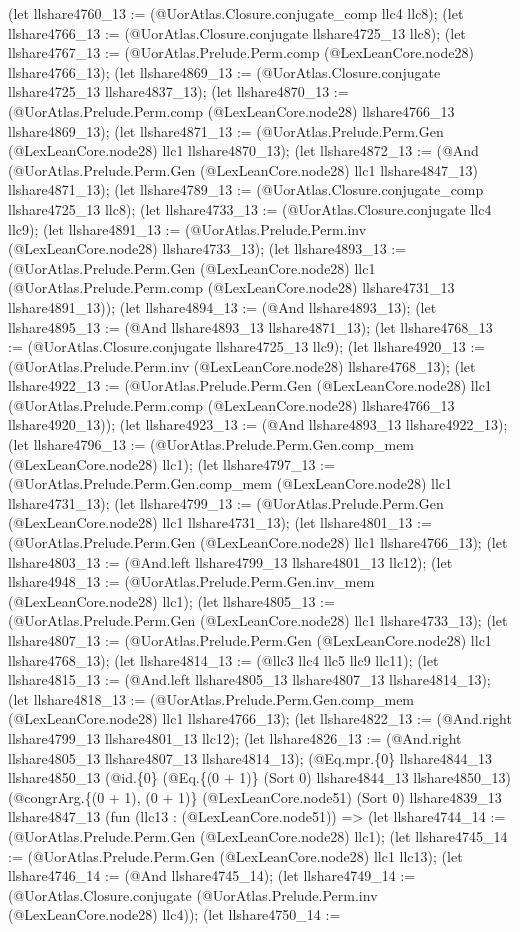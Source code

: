 \documentclass[11pt]{article}
\begin{document}
(let llshare4760\_13 := (@UorAtlas.Closure.conjugate\_comp llc4 llc8); (let llshare4766\_13 := (@UorAtlas.Closure.conjugate llshare4725\_13 llc8); (let llshare4767\_13 := (@UorAtlas.Prelude.Perm.comp (@LexLeanCore.node28) llshare4766\_13); (let llshare4869\_13 := (@UorAtlas.Closure.conjugate llshare4725\_13 llshare4837\_13); (let llshare4870\_13 := (@UorAtlas.Prelude.Perm.comp (@LexLeanCore.node28) llshare4766\_13 llshare4869\_13); (let llshare4871\_13 := (@UorAtlas.Prelude.Perm.Gen (@LexLeanCore.node28) llc1 llshare4870\_13); (let llshare4872\_13 := (@And (@UorAtlas.Prelude.Perm.Gen (@LexLeanCore.node28) llc1 llshare4847\_13) llshare4871\_13); (let llshare4789\_13 := (@UorAtlas.Closure.conjugate\_comp llshare4725\_13 llc8); (let llshare4733\_13 := (@UorAtlas.Closure.conjugate llc4 llc9); (let llshare4891\_13 := (@UorAtlas.Prelude.Perm.inv (@LexLeanCore.node28) llshare4733\_13); (let llshare4893\_13 := (@UorAtlas.Prelude.Perm.Gen (@LexLeanCore.node28) llc1 (@UorAtlas.Prelude.Perm.comp (@LexLeanCore.node28) llshare4731\_13 llshare4891\_13)); (let llshare4894\_13 := (@And llshare4893\_13); (let llshare4895\_13 := (@And llshare4893\_13 llshare4871\_13); (let llshare4768\_13 := (@UorAtlas.Closure.conjugate llshare4725\_13 llc9); (let llshare4920\_13 := (@UorAtlas.Prelude.Perm.inv (@LexLeanCore.node28) llshare4768\_13); (let llshare4922\_13 := (@UorAtlas.Prelude.Perm.Gen (@LexLeanCore.node28) llc1 (@UorAtlas.Prelude.Perm.comp (@LexLeanCore.node28) llshare4766\_13 llshare4920\_13)); (let llshare4923\_13 := (@And llshare4893\_13 llshare4922\_13); (let llshare4796\_13 := (@UorAtlas.Prelude.Perm.Gen.comp\_mem (@LexLeanCore.node28) llc1); (let llshare4797\_13 := (@UorAtlas.Prelude.Perm.Gen.comp\_mem (@LexLeanCore.node28) llc1 llshare4731\_13); (let llshare4799\_13 := (@UorAtlas.Prelude.Perm.Gen (@LexLeanCore.node28) llc1 llshare4731\_13); (let llshare4801\_13 := (@UorAtlas.Prelude.Perm.Gen (@LexLeanCore.node28) llc1 llshare4766\_13); (let llshare4803\_13 := (@And.left llshare4799\_13 llshare4801\_13 llc12); (let llshare4948\_13 := (@UorAtlas.Prelude.Perm.Gen.inv\_mem (@LexLeanCore.node28) llc1); (let llshare4805\_13 := (@UorAtlas.Prelude.Perm.Gen (@LexLeanCore.node28) llc1 llshare4733\_13); (let llshare4807\_13 := (@UorAtlas.Prelude.Perm.Gen (@LexLeanCore.node28) llc1 llshare4768\_13); (let llshare4814\_13 := (@llc3 llc4 llc5 llc9 llc11); (let llshare4815\_13 := (@And.left llshare4805\_13 llshare4807\_13 llshare4814\_13); (let llshare4818\_13 := (@UorAtlas.Prelude.Perm.Gen.comp\_mem (@LexLeanCore.node28) llc1 llshare4766\_13); (let llshare4822\_13 := (@And.right llshare4799\_13 llshare4801\_13 llc12); (let llshare4826\_13 := (@And.right llshare4805\_13 llshare4807\_13 llshare4814\_13); (@Eq.mpr.\{0\} llshare4844\_13 llshare4850\_13 (@id.\{0\} (@Eq.\{(0 + 1)\} (Sort 0) llshare4844\_13 llshare4850\_13) (@congrArg.\{(0 + 1), (0 + 1)\} (@LexLeanCore.node51) (Sort 0) llshare4839\_13 llshare4847\_13 (fun (llc13 : (@LexLeanCore.node51)) => (let llshare4744\_14 := (@UorAtlas.Prelude.Perm.Gen (@LexLeanCore.node28) llc1); (let llshare4745\_14 := (@UorAtlas.Prelude.Perm.Gen (@LexLeanCore.node28) llc1 llc13); (let llshare4746\_14 := (@And llshare4745\_14); (let llshare4749\_14 := (@UorAtlas.Closure.conjugate (@UorAtlas.Prelude.Perm.inv (@LexLeanCore.node28) llc4)); (let llshare4750\_14 := 
\end{document}
